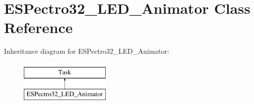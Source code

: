 \hypertarget{classESPectro32__LED__Animator}{\section{E\-S\-Pectro32\-\_\-\-L\-E\-D\-\_\-\-Animator Class Reference}
\label{classESPectro32__LED__Animator}
}
Inheritance diagram for E\-S\-Pectro32\-\_\-\-L\-E\-D\-\_\-\-Animator\-:\begin{figure}[H]
\begin{center}
\leavevmode
\includegraphics[height=2.000000cm]{classESPectro32__LED__Animator}
\end{center}
\end{figure}
